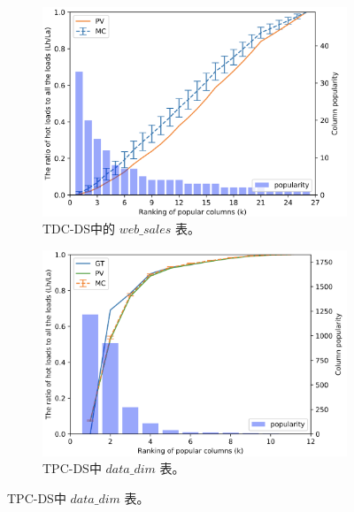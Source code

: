 \begin{figure}[]
\begin{minipage}[t]{0.5\textwidth}
        \begin{subfigure}[t]{1\textwidth}
            \centering
            \includegraphics[width=1\textwidth]{img/cw-cache/calc_web_sales}
            \caption{TDC-DS中的 $web\_sales$ 表。}
            \label{fig:calc-ws}
        \end{subfigure}%
        \caption{列的热度及归一化的$L_h$ 和 $k$之间的关系。蒙特卡罗方法 vs. 公式预测}
	    \label{fig:mc_pv}
    \end{minipage}%
	\begin{minipage}[t]{0.5\textwidth}
        \centering
        \begin{subfigure}[t]{1\textwidth}
            \centering
            \includegraphics[width=1\textwidth]{img/cw-cache/emul_date_dim}
            \caption{TPC-DS中 $data\_dim$ 表。}
            \label{fig:emul-dd}
        \end{subfigure}%
        

\end{minipage}
\end{figure}
